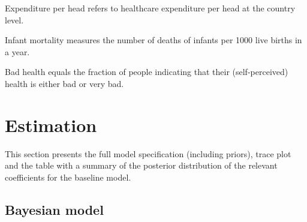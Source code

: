 \documentclass[a4paper,12pt]{article}
\begin{document}
Expenditure per head refers to healthcare expenditure per head at the country level.


Infant mortality measures the number of deaths of infants per 1000 live births in a year.

Bad health equals the fraction of people indicating that their (self-perceived) health is either bad or very bad.


\section{Estimation}
\label{sec:org04a2f14}
\label{sec:estimation_appendix}

This section presents the full model specification (including priors), trace plot and the table with a summary of the posterior distribution of the relevant coefficients for the baseline model. 

\subsection{Bayesian model}
\label{sec:orgeaae59f}
\label{sec:Bayesian_model}
\end{document}
